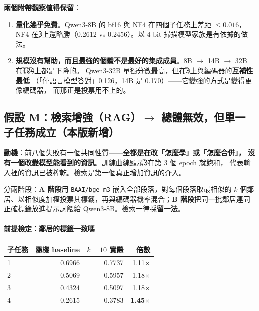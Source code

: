 \documentclass[11pt,a4paper]{ctexart}
\newcommand{\fn}[1]{\texttt{#1}}
\begin{document}
\textbf{兩個附帶觀察值得保留}：

\begin{enumerate}[leftmargin=2em, itemsep=2pt]
  \item \textbf{量化幾乎免費}。Qwen3-8B 的 bf16 與 NF4 在四個子任務上差距
        $\le 0.016$，NF4 在\textcircled{3}上還略勝（0.2612 vs 0.2456）。以 4-bit
        掃描模型家族是有依據的做法。
  \item \textbf{規模沒有幫助，而且最強的個體不是最好的集成成員}。8B $\to$ 14B
        $\to$ 32B 在\textcircled{1}\textcircled{2}\textcircled{4}上都是下降的。
        Qwen3-32B 單獨分數最高，但在\textcircled{3}上與編碼器的\textbf{互補性最低}
        （「僅語言模型答對」0.126，14B 是 0.170）——它變強的方式是變得更像編碼器，
        而那正是投票用不上的。
\end{enumerate}

\subsection*{假設 M：檢索增強（RAG）$\to$ 總體無效，但單一子任務成立（本版新增）}

\textbf{動機}：前八個失敗有一個共同性質——\textbf{全都是在改「怎麼學」或「怎麼合併」，
沒有一個改變模型能看到的資訊}。訓練曲線顯示\textcircled{3}在第 3 個 epoch 就飽和，
代表輸入裡的資訊已被榨乾。檢索是第一個真正增加資訊的介入。

分兩階段：\textbf{A 階段}用 \fn{BAAI/bge-m3} 嵌入全部段落，對每個段落取最相似的 $k$
個鄰居、以相似度加權投票其標籤，再與編碼器機率混合；\textbf{B 階段}把同一批鄰居連同
正確標籤放進提示詞餵給 Qwen3-8B。檢索一律採\textbf{留一法}。

\paragraph{前提檢定：鄰居的標籤一致嗎}

\begin{table}[h]
\centering\small
\begin{tabular}{@{}lrrr@{}}
\toprule
子任務 & 隨機 baseline & $k=10$ 實際 & 倍數 \\
\midrule
\textcircled{1} & 0.6966 & 0.7737 & 1.11$\times$ \\
\textcircled{2} & 0.5069 & 0.5957 & 1.18$\times$ \\
\textcircled{3} & 0.4324 & 0.5097 & 1.18$\times$ \\
\rowcolor{green!10}
\textcircled{4} & 0.2615 & 0.3783 & \textbf{1.45$\times$} \\
\bottomrule
\end{tabular}
\end{table}
\end{document}
